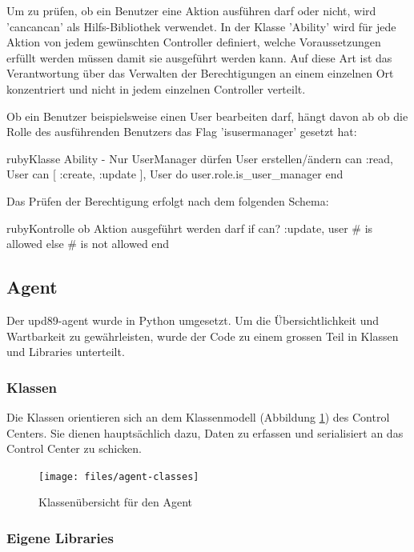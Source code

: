 Um zu prüfen, ob ein Benutzer eine Aktion ausführen darf oder nicht, wird 'cancancan' als Hilfs-Bibliothek verwendet. In der Klasse 'Ability' wird für jede Aktion von jedem gewünschten Controller definiert, welche Voraussetzungen erfüllt werden müssen damit sie ausgeführt werden kann. Auf diese Art ist das Verantwortung über das Verwalten der Berechtigungen an einem einzelnen Ort konzentriert und nicht in jedem einzelnen Controller verteilt.

Ob ein Benutzer beispielsweise einen User bearbeiten darf, hängt davon ab ob die Rolle des ausführenden Benutzers das Flag 'is\textunderscore user\textunderscore manager' gesetzt hat:

\begin{srclst}[label=lst:arch:ability]{ruby}{Klasse Ability - Nur UserManager dürfen User erstellen/ändern}
can :read, User
can [ :create, :update ], User do
  user.role.is_user_manager
end
\end{srclst}

Das Prüfen der Berechtigung erfolgt nach dem folgenden Schema:

\begin{srclst}[label=lst:arch:ability-check]{ruby}{Kontrolle ob Aktion ausgeführt werden darf}
if can? :update, user
    # is allowed
else
    # is not allowed
end
\end{srclst}

\clearpage
\subsection*{Agent} \label{sec:architecture:agent}
Der upd89-agent wurde in Python umgesetzt. Um die Übersichtlichkeit und Wartbarkeit zu gewährleisten, wurde der Code zu einem grossen Teil in Klassen und Libraries unterteilt.

\subsubsection*{Klassen}
Die Klassen orientieren sich an dem Klassenmodell (Abbildung \ref{fig:tec:agentclasses}) des Control Centers. Sie dienen hauptsächlich dazu, Daten zu erfassen und serialisiert an das Control Center zu schicken.

\begin{figure}[H]
	\centering
	\texttt{[image: files/agent-classes]}
	\caption{Klassenübersicht für den Agent}
	\label{fig:tec:agentclasses}
\end{figure}

\subsubsection*{Eigene Libraries}

